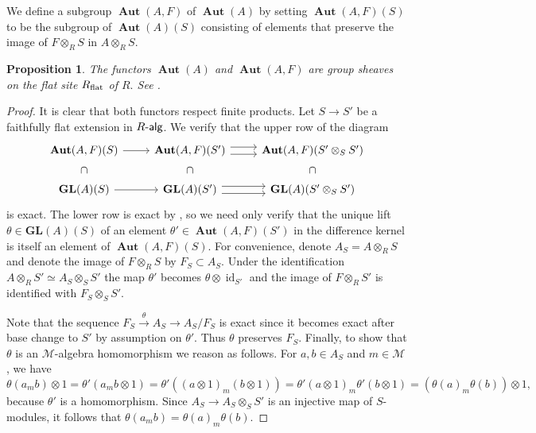 \documentclass{article}
\newtheorem{prop}[thm]{Proposition}
\theoremstyle{definition}
\def\id{\ensuremath{\operatorname{id}}}
\def\BAut{\ensuremath{\operatorname{\mathbf{Aut}}}}
\def\Ralg{\ensuremath{R\text{-\textup{\textsf{alg}}}}}
\def\BGL{\ensuremath{\mathbf{G}\mathbf{L}}}
\def\Mu{\ensuremath{\mathcal{M}}}
\begin{document}
We define a subgroup $\BAut(A,F)$ of $\BAut(A)$ by setting $\BAut(A,F)(S)$ to be the subgroup of  $\BAut(A)(S)$ consisting of elements that  preserve the image of $F \otimes_R S$ in $A \otimes_R S.$ 
\begin{prop} \label{sheaf} The functors $\BAut(A)$ and $\BAut(A,F)$ are group sheaves on the flat site $R_{\rm flat}$ of $R.$ {\rm See  \cite[III \S5 1.1]{DG}.}
\end{prop}
\begin{proof} %
	
	It is clear that both functors respect finite products. Let $S \to S'$ be a faithfully flat extension in $\Ralg$.
	We verify that the upper row of the diagram
	\[
		\begin{tikzcd}
			\BAut(A,F)(S) \ar[r] \ar[d, phantom, "\cap"] & \BAut(A,F)(S')  \ar[r,shift left=.75ex]
			\ar[r,shift right=.75ex,swap] \ar[d, phantom, "\cap"] & \BAut(A,F)(S'\otimes_S S') \ar[d, phantom, "\cap"] \\
			\BGL(A)(S) \ar[r] & \BGL(A)(S')  \ar[r,shift left=.75ex]
			\ar[r,shift right=.75ex,swap] & \BGL(A)(S' \otimes_S S')
		\end{tikzcd}
	\]
	is exact. 
	The lower row is exact by \cite[III \S5 1.10]{DG}, so we need only verify that the unique lift $\theta \in \BGL(A)(S)$ of an element $\theta' \in \BAut(A,F)(S')$ in the difference kernel is itself an element of $\BAut(A,F)(S)$. 
	For convenience, denote $A_S = A \otimes_R S$ and denote the image of $F \otimes_R S$ by $F_S \subset A_S$. 
	Under the identification $A \otimes_R S' \simeq A_S \otimes_S S'$ the map $\theta'$ becomes $\theta \otimes \id_{S'}$ and the image of $F \otimes_R S'$ is identified with $F_S \otimes_S S'$. 
	
	
	Note that the sequence $F_S \xrightarrow{\theta} A_S \to A_S/ F_S$ is exact since it becomes exact after base change to $S'$ by assumption on $\theta'.$
	Thus $\theta$ preserves $F_S$.
Finally, to show that $\theta$ is an $\Mu$-algebra homomorphism we reason as follows. For $a, b \in A_S$ and $m \in \Mu$, we have 
	\[ \theta(a_m b) \otimes 1 = \theta'(a_m b \otimes 1) =  \theta'( (a \otimes 1)_m (b \otimes 1) ) = \theta'(a \otimes 1)_m \theta'(b \otimes 1) = (\theta(a)_m \theta(b)) \otimes 1, \] 
	because $\theta'$ is a homomorphism. Since  $A_S \to A_S \otimes_S S'$ is an injective map of $S$-modules, it follows that $\theta(a_m b)= \theta(a)_m \theta(b)$.\end{proof}
\end{document}
